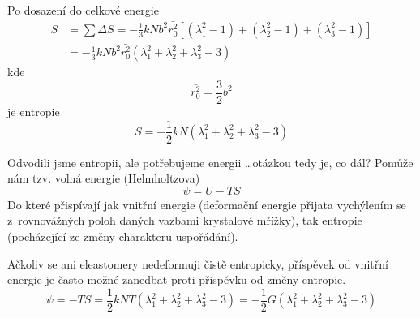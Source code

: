 Po dosazení do celkové energie
\begin{equation}\begin{split}
	S &= \sum \Delta S
	= -\frac{1}{3} k N b^2 \bar{r_0^2} \left[ (\lambda_1^2-1) + (\lambda_2^2-1) + (\lambda_3^2-1) \right]\\
	&= -\frac{1}{3} k N b^2 \bar{r_0^2} \left( \lambda_1^2 + \lambda_2^2 + \lambda_3^2 - 3 \right)
\end{split}\end{equation}
kde
\begin{equation*}
	\bar{r_0^2} = \frac{3}{2} b^2
\end{equation*}
je entropie
\begin{equation}
	S = -\frac{1}{2} k N \left( \lambda_1^2 + \lambda_2^2 + \lambda_3^2 - 3 \right)
\end{equation}

Odvodili jsme entropii, ale potřebujeme energii \ldots otázkou tedy je, co dál?
Pomůže nám tzv. volná energie (Helmholtzova)
\begin{equation}
	\psi = U - TS
\end{equation}
Do které přispívají jak vnitřní energie (deformační energie přijata vychýlením se z~rovnovážných poloh daných vazbami krystalové mřížky), tak entropie (pocházející ze změny charakteru uspořádání). 

Ačkoliv se ani eleastomery nedeformuji čistě entropicky, příspěvek od vnitřní energie je často možné zanedbat proti příspěvku od změny entropie. 
\begin{equation}
	\psi = -TS = \frac{1}{2} k N T \left( \lambda_1^2 + \lambda_2^2 + \lambda_3^2 - 3 \right)
	= -\frac{1}{2} G \left( \lambda_1^2 + \lambda_2^2 + \lambda_3^2 - 3 \right)
\end{equation}

